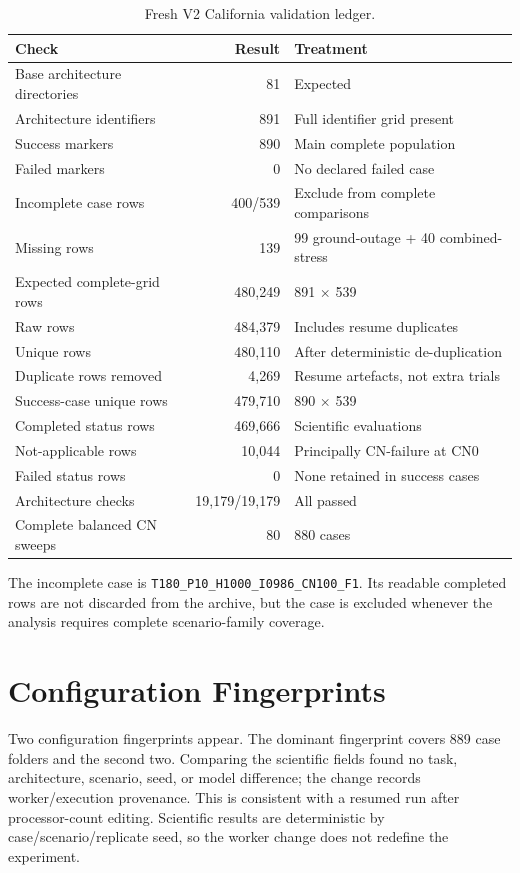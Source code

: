 \begin{table}[p]
\centering
\scriptsize
\caption{Fresh V2 California validation ledger.}
\label{tab:v2_validation_ledger}
\begin{tabularx}{\textwidth}{L{0.39\textwidth}rY}
\toprule
Check & Result & Treatment \\
\midrule
Base architecture directories & 81 & Expected \\
Architecture identifiers & 891 & Full identifier grid present \\
Success markers & 890 & Main complete population \\
Failed markers & 0 & No declared failed case \\
Incomplete case rows & 400/539 & Exclude from complete comparisons \\
Missing rows & 139 & 99 ground-outage + 40 combined-stress \\
Expected complete-grid rows & 480,249 & 891 $\times$ 539 \\
Raw rows & 484,379 & Includes resume duplicates \\
Unique rows & 480,110 & After deterministic de-duplication \\
Duplicate rows removed & 4,269 & Resume artefacts, not extra trials \\
Success-case unique rows & 479,710 & 890 $\times$ 539 \\
Completed status rows & 469,666 & Scientific evaluations \\
Not-applicable rows & 10,044 & Principally CN-failure at CN0 \\
Failed status rows & 0 & None retained in success cases \\
Architecture checks & 19,179/19,179 & All passed \\
Complete balanced CN sweeps & 80 & 880 cases \\
\bottomrule
\end{tabularx}
\end{table}

The incomplete case is \texttt{T180\_P10\_H1000\_I0986\_CN100\_F1}. Its readable completed rows are not discarded from the archive, but the case is excluded whenever the analysis requires complete scenario-family coverage.

\section{Configuration Fingerprints}

Two configuration fingerprints appear. The dominant fingerprint covers 889 case folders and the second two. Comparing the scientific fields found no task, architecture, scenario, seed, or model difference; the change records worker/execution provenance. This is consistent with a resumed run after processor-count editing. Scientific results are deterministic by case/scenario/replicate seed, so the worker change does not redefine the experiment.


